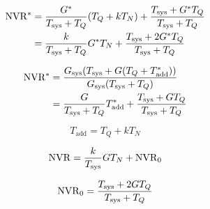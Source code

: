 \documentclass{article}
\begin{document}
\begin{equation*}
\begin{aligned}
\mathrm{NVR^*} &= \frac{G^*}{T_{\mathrm{sys}}+T_Q} (T_Q + k T_N) + \frac{T_{\mathrm{sys}}+G^* T_Q}{T_{\mathrm{sys}}+T_Q}\\
&= \frac{k}{T_{\mathrm{sys}} + T_Q} G^* T_N + \frac{T_{\mathrm{sys}} + 2 G^* T_Q}{T_{\mathrm{sys}} + T_Q}
\end{aligned}
\end{equation*}

\begin{equation*}
\begin{aligned}
\mathrm{NVR^*} &= \frac{G_{\mathrm{sys}}(T_{\mathrm{sys}}+G(T_Q+T^*_{\mathrm{add}}))}{G_{\mathrm{sys}}(T_{\mathrm{sys}}+T_Q)}\\
&= \frac{G}{T_{\mathrm{sys}}+T_Q}T^*_\mathrm{add} + \frac{T_{\mathrm{sys}}+G T_Q}{T_{\mathrm{sys}}+T_Q}
\end{aligned}
\end{equation*}



\[
T_\mathrm{add} = T_Q + k T_N
\]

\[
\mathrm{NVR} = \frac{k}{T_{\mathrm{sys}}} GT_N + \mathrm{NVR}_0
\]

\[
\mathrm{NVR}_0 = \frac{T_{\mathrm{sys}} + 2 G T_Q}{T_{\mathrm{sys}} + T_Q}
\]
\end{document}
